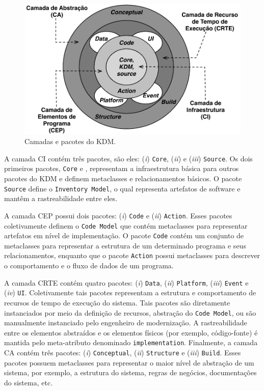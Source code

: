 %
\begin{figure}[htb]
 \caption{Camadas e pacotes do KDM.}
 \label{fig:kdm_layer}
 \centering
 \includegraphics[scale=0.67]{images/kdm_layers.pdf}
\end{figure}
%
A camada CI contém três pacotes, são eles: (\textit{i}) \texttt{Core}, (\textit{ii}) \texttt{} e (\textit{iii}) \texttt{Source}. Os dois primeiros pacotes, \texttt{Core} e \texttt{}, representam a infraestrutura básica para outros pacotes do KDM e definem metaclasses e relacionamentos básicos. O pacote \texttt{Source} define o \texttt{Inventory Model}, o qual representa artefatos de software e mantêm a rastreabilidade entre eles. 

A camada CEP possui dois pacotes: (\textit{i}) \texttt{Code} e (\textit{ii}) \texttt{Action}. Esses pacotes coletivamente definem o \texttt{Code Model} que contém metaclasses para representar artefatos em nível de implementação. O pacote \texttt{Code} contém um conjunto de metaclasses para representar a estrutura de um determinado programa e seus relacionamentos, enquanto que o pacote \texttt{Action} possui metaclasses para descrever o comportamento e o fluxo de dados de um programa.

A camada CRTE contém quatro pacotes: (\textit{i}) \texttt{Data}, (\textit{ii}) \texttt{Platform}, (\textit{iii}) \texttt{Event} e (\textit{iv}) \texttt{UI}. Coletivamente tais pacotes representam a estrutura e comportamento de recursos de tempo de execução do sistema. Tais pacotes são diretamente instanciados por meio da definição de recursos, abstração do \texttt{Code Model}, ou são manualmente instanciado pelo engenheiro de modernização. A rastreabilidade entre os elementos abstraídos e os elementos físicos (por exemplo, código-fonte) é mantida pelo meta-atributo denominado \texttt{implementation}. Finalmente, a camada CA contém três pacotes: (\textit{i}) \texttt{Conceptual}, (\textit{ii}) \texttt{Structure} e (\textit{iii}) \texttt{Build}. Esses pacotes possuem metaclasses para representar o maior nível de abstração de um sistema, por exemplo, a estrutura do sistema, regras de negócios, documentações do sistema, etc.

